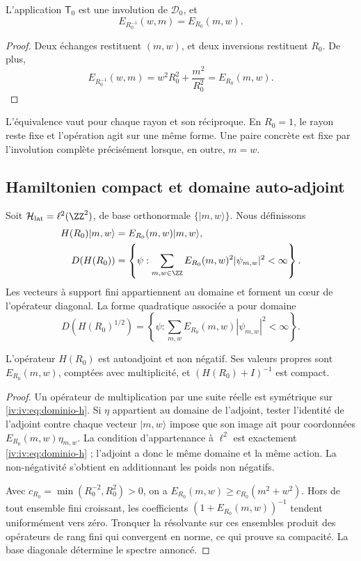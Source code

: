 \begin{theorem}
\label{iv:iv:thm:dualidad-escalar}
L’application \(\mathsf T_0\) est une involution de
\(\mathscr D_0\), et
\[
 E_{R_0^{-1}}(w,m)=E_{R_0}(m,w).
\]
\end{theorem}
\begin{proof}
Deux échanges restituent \((m,w)\), et deux inversions restituent
\(R_0\). De plus,
\[
 E_{R_0^{-1}}(w,m)=w^2R_0^2+\frac{m^2}{R_0^2}
 =E_{R_0}(m,w).
\]
\end{proof}

L’équivalence vaut pour chaque rayon et son réciproque. En \(R_0=1\),
le rayon reste fixe et l’opération agit sur une même forme.
Une paire concrète est fixe par l’involution complète précisément
lorsque, en outre, \(m=w\).

\subsection{Hamiltonien compact et domaine auto-adjoint}

Soit \(\mathcal H_{\mathrm{lat}}=\ell^2(\ZZ^2)\), de base
orthonormale \(\{|m,w\rangle\}\). Nous définissons
\begin{align}
 H(R_0)|m,w\rangle&=E_{R_0}(m,w)|m,w\rangle,\label{iv:iv:eq:hamiltoniano}\\
 D(H(R_0))&=\left\{\psi:\sum_{m,w\in\ZZ}
 E_{R_0}(m,w)^2|\psi_{m,w}|^2<\infty\right\}.\label{iv:iv:eq:dominio-h}
\end{align}
Les vecteurs à support fini appartiennent au domaine et forment un
cœur de l’opérateur diagonal. La forme quadratique associée a pour
domaine
\[
 D(H(R_0)^{1/2})=\left\{\psi:\sum_{m,w}
 E_{R_0}(m,w)|\psi_{m,w}|^2<\infty\right\}.
\]

\begin{proposition}
\label{iv:iv:prop:h-autoadjunto}
L’opérateur \(H(R_0)\) est autoadjoint et non négatif. Ses
valeurs propres sont \(E_{R_0}(m,w)\), comptées avec multiplicité,
et \((H(R_0)+I)^{-1}\) est compact.
\end{proposition}
\begin{proof}
Un opérateur de multiplication par une suite réelle est symétrique
sur \eqref{iv:iv:eq:dominio-h}. Si \(\eta\) appartient au domaine
de l’adjoint, tester l’identité de l’adjoint contre chaque vecteur
\(|m,w\rangle\) impose que son image ait pour coordonnées
\(E_{R_0}(m,w)\eta_{m,w}\). La condition d’appartenance à
\(\ell^2\) est exactement \eqref{iv:iv:eq:dominio-h} ; l’adjoint a donc
le même domaine et la même action. La non-négativité
s’obtient en additionnant les poids non négatifs.

Avec \(c_{R_0}=\min(R_0^{-2},R_0^2)>0\), on a
\(E_{R_0}(m,w)\geq c_{R_0}(m^2+w^2)\). Hors de tout
ensemble fini croissant, les coefficients
\((1+E_{R_0}(m,w))^{-1}\) tendent uniformément vers zéro.
Tronquer la résolvante sur ces ensembles produit des opérateurs
de rang fini qui convergent en norme, ce qui prouve sa
compacité. La base diagonale détermine le spectre annoncé.
\end{proof}

